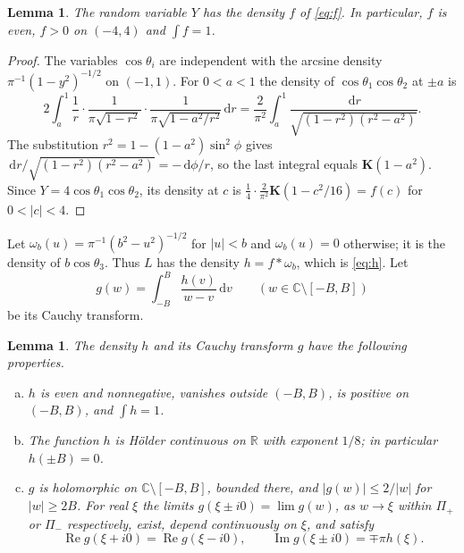 \documentclass[11pt]{amsart}
\numberwithin{equation}{section}
\newtheorem{lemma}[theorem]{Lemma}
\theoremstyle{definition}
\theoremstyle{remark}
\newcommand{\C}{\mathbb{C}}
\newcommand{\R}{\mathbb{R}}
\newcommand{\Pim}{\Pi_{-}}
\newcommand{\Pip}{\Pi_{+}}
\newcommand{\dd}{\,\mathrm{d}}
\DeclareMathOperator{\re}{Re}
\DeclareMathOperator{\im}{Im}
\newcommand{\Kc}{\mathbf{K}}
\begin{document}
\begin{lemma}\label{lem:f}
The random variable $Y$ has the density $f$ of \eqref{eq:f}. In particular,
$f$ is even, $f>0$ on $(-4,4)$ and $\int f=1$.
\end{lemma}

\begin{proof}
The variables $\cos\theta_i$ are independent with the arcsine density
$\pi^{-1}(1-y^2)^{-1/2}$ on $(-1,1)$. For $0<a<1$ the density of
$\cos\theta_1\cos\theta_2$ at $\pm a$ is
\[
2\int_a^1\frac1r\cdot\frac{1}{\pi\sqrt{1-r^2}}\cdot\frac{1}{\pi\sqrt{1-a^2/r^2}}\dd r
=\frac{2}{\pi^2}\int_a^1\frac{\dd r}{\sqrt{(1-r^2)(r^2-a^2)}} .
\]
The substitution $r^2=1-(1-a^2)\sin^2\phi$ gives
$\dd r/\sqrt{(1-r^2)(r^2-a^2)}=-\dd\phi/r$, so the last integral equals
$\Kc(1-a^2)$. Since $Y=4\cos\theta_1\cos\theta_2$, its density at $c$ is
$\frac14\cdot\frac2{\pi^2}\Kc(1-c^2/16)=f(c)$ for $0<|c|<4$.
\end{proof}

Let $\omega_b(u)=\pi^{-1}(b^2-u^2)^{-1/2}$ for $|u|<b$ and $\omega_b(u)=0$
otherwise; it is the density of $b\cos\theta_3$. Thus $L$ has the density
$h=f*\omega_b$, which is \eqref{eq:h}. Let
\begin{equation}\label{eq:g}
g(w)=\int_{-B}^{B}\frac{h(v)}{w-v}\dd v\qquad(w\in\C\setminus[-B,B])
\end{equation}
be its Cauchy transform.

\begin{lemma}\label{lem:h}
The density $h$ and its Cauchy transform $g$ have the following properties.
\begin{enumerate}[(a)]
\item $h$ is even and nonnegative, vanishes outside $(-B,B)$, is positive on
$(-B,B)$, and $\int h=1$.
\item The function $h$ is H\"older continuous on $\R$ with exponent $1/8$; in
particular $h(\pm B)=0$.
\item $g$ is holomorphic on $\C\setminus[-B,B]$, bounded there, and
$|g(w)|\le2/|w|$ for $|w|\ge2B$. For real $\xi$ the limits
$g(\xi\pm i0)=\lim g(w)$, as $w\to \xi$ within $\Pip$ or $\Pim$ respectively,
exist, depend continuously on $\xi$,
and satisfy
\begin{equation}\label{eq:plemelj}
\re g(\xi+i0)=\re g(\xi-i0),\qquad \im g(\xi\pm i0)=\mp\pi h(\xi).
\end{equation}
\end{enumerate}
\end{lemma}
\end{document}
